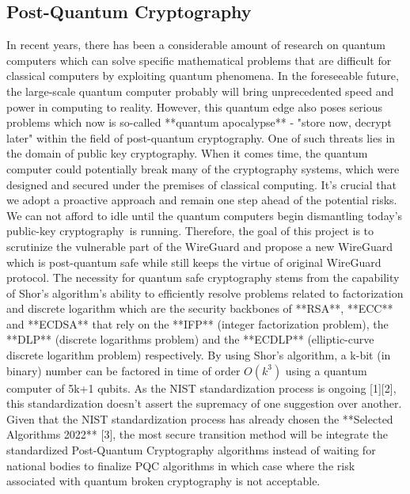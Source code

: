 \subsection{Post-Quantum Cryptography}
In recent years, there has been a considerable amount of research on quantum computers which can solve specific mathematical problems that are difficult for classical computers by exploiting quantum phenomena. In the foreseeable future, the large-scale quantum computer probably will bring unprecedented speed and power in computing to reality. However, this quantum edge also poses serious problems which now is so-called **quantum apocalypse** - "store now, decrypt later" within the field of post-quantum cryptography. One of such threats lies in the domain of public key cryptography. When it comes time, the quantum computer could potentially break many of the cryptography systems, which were designed and secured under the premises of classical computing. It's crucial that we adopt a proactive approach and remain one step ahead of the potential risks. We can not afford to idle until the quantum computers begin dismantling today’s public-key cryptography is running. Therefore, the goal of this project is to scrutinize the vulnerable part of the WireGuard and propose a new WireGuard which is post-quantum safe while still keeps the virtue of original WireGuard protocol. 
The necessity for quantum safe cryptography stems from the capability of Shor's algorithm's ability to efficiently resolve problems related to factorization and discrete logarithm which are the security backbones of **RSA**, **ECC** and **ECDSA** that rely on the **IFP** (integer factorization problem), the **DLP** (discrete logarithms problem) and the **ECDLP** (elliptic-curve discrete logarithm problem) respectively. By using Shor's algorithm, a k-bit (in binary) number can be factored in time of order $O(k^3)$ using a quantum computer of 5k+1 qubits. As the NIST standardization process is ongoing [1][2], this standardization doesn't assert the supremacy of one suggestion over another. Given that the NIST standardization process has already chosen the **Selected Algorithms 2022** [3], the most secure transition method will be integrate the standardized Post-Quantum Cryptography algorithms instead of waiting for national bodies to finalize PQC algorithms in which case where the risk associated with quantum broken cryptography is not acceptable.


